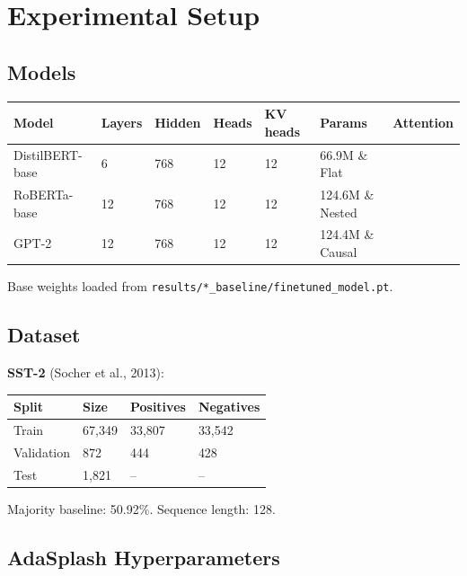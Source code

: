 
\section{Experimental Setup}

\subsection{Models}

\begin{table}[H]
\centering
\small
\begin{tabular}{lllllll}
\toprule
\textbf{Model} & \textbf{Layers} & \textbf{Hidden} & \textbf{Heads} & \textbf{KV heads} & \textbf{Params} & \textbf{Attention} \\
\midrule
DistilBERT-base & 6 & 768 & 12 & 12 & 66.9M \& Flat \\
RoBERTa-base & 12 & 768 & 12 & 12 & 124.6M \& Nested \\
GPT-2 & 12 & 768 & 12 & 12 & 124.4M \& Causal \\
\bottomrule
\end{tabular}
\end{table}

Base weights loaded from \texttt{results/*\_baseline/finetuned\_model.pt}.

\subsection{Dataset}

\textbf{SST-2} (Socher et al., 2013):

\begin{table}[H]
\centering
\small
\begin{tabular}{llll}
\toprule
\textbf{Split} & \textbf{Size} & \textbf{Positives} & \textbf{Negatives} \\
\midrule
Train & 67,349 & 33,807 & 33,542 \\
Validation & 872 & 444 & 428 \\
Test & 1,821 & -- & -- \\
\bottomrule
\end{tabular}
\end{table}

Majority baseline: 50.92\%. Sequence length: 128.

\subsection{AdaSplash Hyperparameters}

